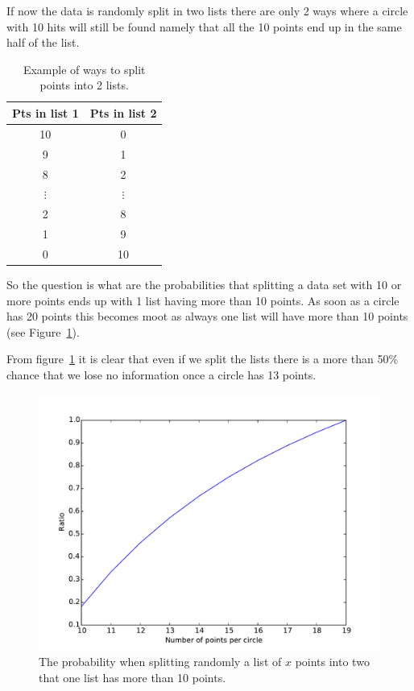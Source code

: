 \documentclass[11pt,twoside]{scrreprt}
\begin{document}
If now the data is randomly split in two lists there are only 2 ways where
a circle with 10 hits will still be found namely that all the 10 points end
up in the same half of the list.
  \begin{table}[tb]
  \centering
  \caption{Example of ways to split points into 2 lists.}
    \label{tab:point_split}
  \begin{tabular}{cc}
  \toprule
  \textbf{Pts in list 1} & \textbf{Pts in list 2} \\
  \midrule
     10 & 0 \\
     9  & 1 \\
     8  & 2 \\
     $\vdots$ & $\vdots$ \\
     2 & 8\\
     1 & 9\\
     0 & 10 \\
  \bottomrule
  \end{tabular}

\end{table}

So the question is what are the probabilities that splitting a data set with
10 or more points ends up with 1 list having more than 10 points. As soon as
a circle has 20 points this becomes moot as always one list will have more 
than 10 points (see Figure~\ref{fig:ratios}).

From figure~\ref{fig:ratios} it is clear that even if we split the lists there is a more 
than 50\% chance that we lose no information once a circle has 13 points.
\begin{figure}[htb]
  \centering
  \includegraphics[width=\textwidth]{pics/ratio.pdf}
  \caption{The probability when splitting randomly a list of $x$ points into two that one list has more than 10 points.}
  \label{fig:ratios}
\end{figure}
\end{document}
